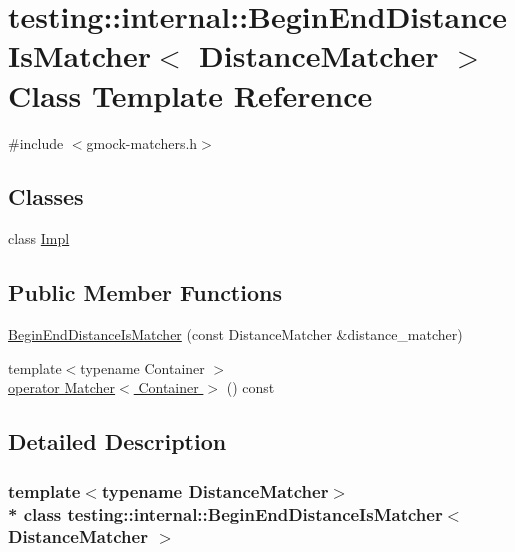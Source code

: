 \hypertarget{classtesting_1_1internal_1_1_begin_end_distance_is_matcher}{}\section{testing\+:\+:internal\+:\+:Begin\+End\+Distance\+Is\+Matcher$<$ Distance\+Matcher $>$ Class Template Reference}
\label{classtesting_1_1internal_1_1_begin_end_distance_is_matcher}


{\ttfamily \#include $<$gmock-\/matchers.\+h$>$}

\subsection*{Classes}
\begin{DoxyCompactItemize}
\item 
class \hyperlink{classtesting_1_1internal_1_1_begin_end_distance_is_matcher_1_1_impl}{Impl}
\end{DoxyCompactItemize}
\subsection*{Public Member Functions}
\begin{DoxyCompactItemize}
\item 
\hyperlink{classtesting_1_1internal_1_1_begin_end_distance_is_matcher_aaf0d34d922d89820346e80a21cbf8d24}{Begin\+End\+Distance\+Is\+Matcher} (const Distance\+Matcher \&distance\+\_\+matcher)
\item 
{\footnotesize template$<$typename Container $>$ }\\\hyperlink{classtesting_1_1internal_1_1_begin_end_distance_is_matcher_aef8f6ec8dfce159fb79eec6a1ea011bb}{operator Matcher$<$ Container $>$} () const 
\end{DoxyCompactItemize}


\subsection{Detailed Description}
\subsubsection*{template$<$typename Distance\+Matcher$>$\\*
class testing\+::internal\+::\+Begin\+End\+Distance\+Is\+Matcher$<$ Distance\+Matcher $>$}



